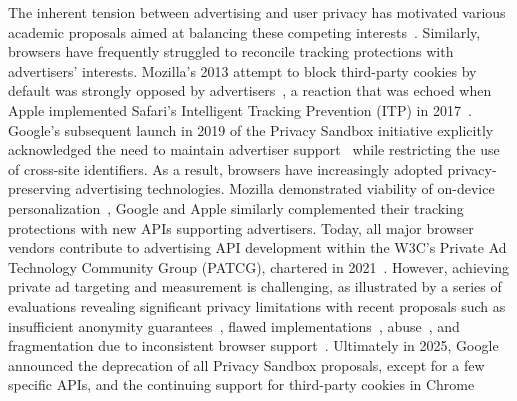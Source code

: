 % 
%
The inherent tension between advertising and user privacy has motivated various academic proposals aimed at balancing these competing interests~\cite{toubianaAdnosticPrivacyPreserving2010,guhaPrivadPracticalPrivacy2011,backesObliviAdProvablySecure2012}. Similarly, browsers have frequently struggled to reconcile tracking protections with advertisers' interests. Mozilla’s 2013 attempt to block third-party cookies by default was strongly opposed by advertisers~\cite{ribeiroMozillaPostponesDefault2013}, a reaction that was echoed when Apple implemented Safari's Intelligent Tracking Prevention (ITP) in 2017~\cite{stattAdvertisersAreFurious2017}. Google's subsequent launch in 2019 of the Privacy Sandbox initiative explicitly acknowledged the need to maintain advertiser support~\cite{schuhBuildingMorePrivate2019,chromeBuildingMorePrivate2020} while restricting the use of cross-site identifiers.
% 
As a result, browsers have increasingly adopted privacy-preserving advertising technologies. Mozilla demonstrated viability of on-device personalization~\cite{mozillaProvidingValuablePlatform2015}, Google and Apple similarly complemented their tracking protections with new APIs supporting advertisers. Today, all major browser vendors contribute to advertising API development within the W3C’s Private Ad Technology Community Group (PATCG), chartered in 2021~\cite{hercherW3CAdPrivacy2022}.
% 
However, achieving private ad targeting and measurement is challenging, as illustrated by a series of evaluations revealing significant privacy limitations with recent proposals
such as insufficient anonymity guarantees~\cite{rescorlaTechnicalCommentsFLoC2021,berkePrivacyLimitationsInterestbased2022,thomsonPrivacyAnalysisGoogles2023,jhaRobustnessTopicsAPI2023,beuginInterestdisclosingMechanismsAdvertising2024,beuginPublicReproducibleAssessment2024,thomsonAnalysisApplesPrivate2022,thomsonProtectedAudiencePrivacy2024,longEvaluatingGooglesProtected2024,zohaibInvestigatingTrafficAnalysis2023}, flawed implementations~\cite{turatiLocalitySensitiveHashingDoes2023,calderonioFledgingWillContinue2024,nisenoffExploitingSharedStorage2025}, abuse~\cite{senolUnveilingImpactUserAgent2023,wieflingPrivacyMeasureTurned2024}, and fragmentation due to inconsistent browser support~\cite{munirGooglesChromeAntitrust2024}. 
% 
Ultimately in 2025, Google announced the deprecation of all Privacy Sandbox proposals, except for a few specific APIs, and the continuing support for third-party cookies in Chrome~\cite{chavezUpdatePlansPrivacy2025,beuginTechnicalReportNeed2025}

